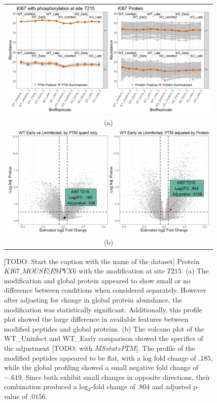\documentclass{mcp}
\def\todo#1{{\color{red}[TODO: #1]}}
\begin{document}
\begin{figure}[h!]
\centering
 \begin{tabular}{c}
	\includegraphics[width=.9\textwidth]{sim_new/Difference_Shigella_Profile_Plot}\\
	(a)\\
	\includegraphics[width=.8\textwidth]{sim_new/Difference_Shigella_Volcano}\\
	(b)
 \end{tabular}
 \caption{\todo{Start the caption with the name of the dataset} Protein $KI67\_MOUSE|E9PVX6$ with the modification at site $T215$. (a) The modification and global protein appeared to show small or no difference between conditions when considered separately. However after adjusting for change in global protein abundance, the modification was statistically significant. Additionally, this profile plot showed the large difference in available features between modified peptides and global proteins. (b) The volcano plot of the WT\_Uninfect and WT\_Early comparison showed the specifics of the adjustment \todo{with $MSstatsPTM$}. The profile of the modified peptides appeared to be flat, with a log fold change of $.185$, while the global profiling showed a small negative fold change of $-.619$. Since both exhibit small changes in opposite directions, their combination produced a log$_2$-fold change of $.804$ and adjusted p-value of $.0156$.}
\label{fig:Diff_Shigella_PTM}
\end{figure}
\end{document}
